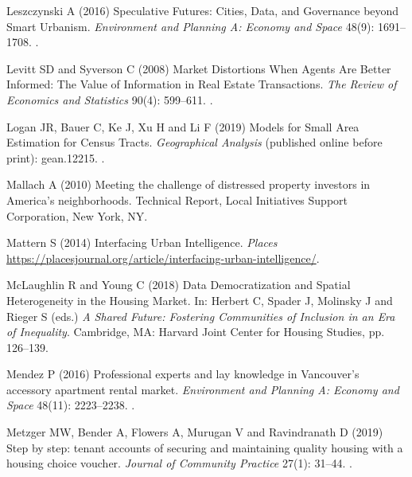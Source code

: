 \documentclass[11pt,letterpaper]{article}
\begin{document}
\begin{thebibliography}{77}
	Leszczynski A (2016) Speculative {Futures}: {Cities}, {Data}, and {Governance}
	beyond {Smart} {Urbanism}.
	\newblock \emph{Environment and Planning A: Economy and Space} 48(9):
	1691--1708.
	\newblock {}.
	
	Levitt SD and Syverson C (2008) Market {Distortions} {When} {Agents} {Are}
	{Better} {Informed}: {The} {Value} of {Information} in {Real} {Estate}
	{Transactions}.
	\newblock \emph{The Review of Economics and Statistics} 90(4): 599--611.
	\newblock {}.
	
	Logan JR, Bauer C, Ke J, Xu H and Li F (2019) Models for {Small} {Area}
	{Estimation} for {Census} {Tracts}.
	\newblock \emph{Geographical Analysis} (published online before print): gean.12215.
	\newblock {}.
	
	Mallach A (2010) Meeting the challenge of distressed property investors in
	{America}'s neighborhoods.
	\newblock Technical Report, Local Initiatives Support Corporation, New York, NY.
	
	Mattern S (2014) Interfacing {Urban} {Intelligence}.
	\newblock \emph{Places}
	\urlprefix\url{https://placesjournal.org/article/interfacing-urban-intelligence/}.
	
	McLaughlin R and Young C (2018) Data {Democratization} and {Spatial}
	{Heterogeneity} in the {Housing} {Market}.
	\newblock In: Herbert C, Spader J, Molinsky J and Rieger S (eds.) \emph{A
		{Shared} {Future}: {Fostering} {Communities} of {Inclusion} in an {Era} of
		{Inequality}}. Cambridge, MA: Harvard Joint Center for Housing Studies, pp.
	126--139.
	
	Mendez P (2016) Professional experts and lay knowledge in {Vancouver}'s
	accessory apartment rental market.
	\newblock \emph{Environment and Planning A: Economy and Space} 48(11): 2223--2238.
	\newblock {}.
	
	Metzger MW, Bender A, Flowers A, Murugan V and Ravindranath D (2019) Step by
	step: tenant accounts of securing and maintaining quality housing with a
	housing choice voucher.
	\newblock \emph{Journal of Community Practice} 27(1): 31--44.
	\newblock {}.
	

\end{thebibliography}
\end{document}

